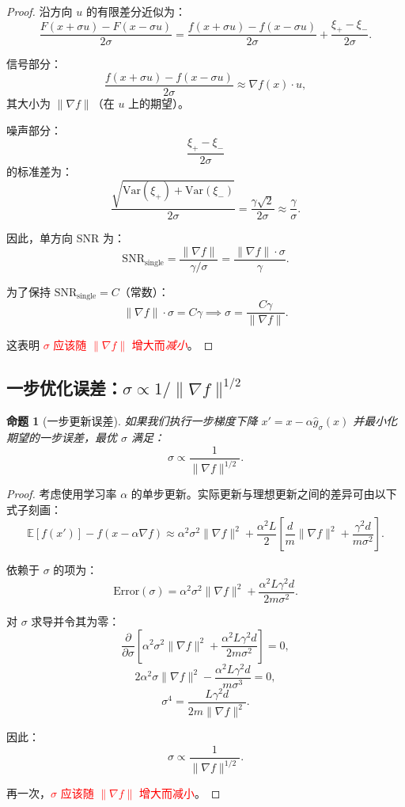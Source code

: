 \documentclass{article}
\newtheorem{proposition}{命题}
\begin{document}
\begin{proof}
沿方向 $u$ 的有限差分近似为：
\[
\frac{F(x+\sigma u) - F(x-\sigma u)}{2\sigma} = \frac{f(x+\sigma u) - f(x-\sigma u)}{2\sigma} + \frac{\xi_+ - \xi_-}{2\sigma}.
\]

信号部分：
\[
\frac{f(x+\sigma u) - f(x-\sigma u)}{2\sigma} \approx \nabla f(x) \cdot u,
\]
其大小为 $\|\nabla f\|$（在 $u$ 上的期望）。

噪声部分：
\[
\frac{\xi_+ - \xi_-}{2\sigma}
\]
的标准差为：
\[
\frac{\sqrt{\text{Var}(\xi_+) + \text{Var}(\xi_-)}}{2\sigma} = \frac{\gamma\sqrt{2}}{2\sigma} \approx \frac{\gamma}{\sigma}.
\]

因此，单方向 SNR 为：
\[
\text{SNR}_{\text{single}} = \frac{\|\nabla f\|}{\gamma/\sigma} = \frac{\|\nabla f\|\cdot\sigma}{\gamma}.
\]

为了保持 $\text{SNR}_{\text{single}} = C$（常数）：
\[
\|\nabla f\|\cdot\sigma = C\gamma
\implies
\boxed{\sigma = \frac{C\gamma}{\|\nabla f\|}}.
\]

这表明 \textcolor{red}{$\sigma$ 应该随 $\|\nabla f\|$ 增大而\emph{减小}}。
\end{proof}

\subsection{一步优化误差：$\sigma \propto 1/\|\nabla f\|^{1/2}$}

\begin{proposition}[一步更新误差]
如果我们执行一步梯度下降 $x' = x - \alpha\widehat{g}_\sigma(x)$ 并最小化期望的一步误差，最优 $\sigma$ 满足：
\[
\sigma \propto \frac{1}{\|\nabla f\|^{1/2}}.
\]
\end{proposition}

\begin{proof}
考虑使用学习率 $\alpha$ 的单步更新。实际更新与理想更新之间的差异可由以下式子刻画：
\[
\mathbb{E}[f(x')] - f(x - \alpha\nabla f)
\approx
\alpha^2\sigma^2\|\nabla f\|^2 + \frac{\alpha^2 L}{2}\left[\frac{d}{m}\|\nabla f\|^2 + \frac{\gamma^2 d}{m\sigma^2}\right].
\]

依赖于 $\sigma$ 的项为：
\[
\text{Error}(\sigma) = \alpha^2\sigma^2\|\nabla f\|^2 + \frac{\alpha^2 L\gamma^2 d}{2m\sigma^2}.
\]

对 $\sigma$ 求导并令其为零：
\[
\frac{\partial}{\partial\sigma}\left[\alpha^2\sigma^2\|\nabla f\|^2 + \frac{\alpha^2 L\gamma^2 d}{2m\sigma^2}\right] = 0,
\]
\[
2\alpha^2\sigma\|\nabla f\|^2 - \frac{\alpha^2 L\gamma^2 d}{m\sigma^3} = 0,
\]
\[
\sigma^4 = \frac{L\gamma^2 d}{2m\|\nabla f\|^2}.
\]

因此：
\[
\boxed{\sigma \propto \frac{1}{\|\nabla f\|^{1/2}}.}
\]

再一次，\textcolor{red}{$\sigma$ 应该随 $\|\nabla f\|$ 增大而减小}。
\end{proof}
\end{document}
